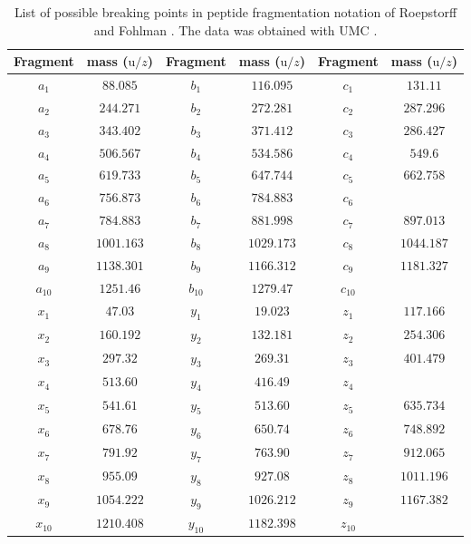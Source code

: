 \documentclass[a4paper,10pt]{article}
\begin{document}
\begin{appendices}
\begin{table}[htp!]
	\centering
	\caption{List of possible breaking points in peptide fragmentation notation of Roepstorff and Fohlman \cite{fragmentsnomenclature}. The data was obtained with UMC \cite{umc}. }
	\begin{tabular}{c | c | c | c | c | c}
		Fragment & mass (${\mathrm{u}}/{z}$) & Fragment & mass (${\mathrm{u}}/{z}$) & Fragment & mass (${\mathrm{u}}/{z}$) \\ \hline
		$a_1$ & $88.085$ & $b_1$ & $116.095$ & $c_1$ & $131.11$ \\
		$a_2$ & $244.271$ & $b_2$ & $272.281$ & $c_2$ & $287.296$ \\
		$a_3$ & $343.402$ & $b_3$ & $371.412$ & $c_3$ & $286.427$ \\
		$a_4$ & $506.567$ & $b_4$ & $534.586$ & $c_4$ & $549.6$ \\
		$a_5$ & $619.733$ & $b_5$ & $647.744$ & $c_5$ & $662.758$ \\
		$a_6$ & $756.873$ & $b_6$ & $784.883$ & $c_6$ &  \\
		$a_7$ & $784.883$ & $b_7$ & $881.998$ & $c_7$ & $897.013$ \\
		$a_8$ & $1001.163$ & $b_8$ & $1029.173$ & $c_8$ & $1044.187$ \\
		$a_9$ & $1138.301$ & $b_9$ & $1166.312$ & $c_9$ & $1181.327$ \\
		$a_{10}$ & $1251.46$ & $b_{10}$ & $1279.47$ & $c_{10}$ &  \\
		$x_{1}$ & $47.03$ & $y_{1}$ & $19.023$ & $z_{1}$ & $117.166$ \\
    $x_{2}$ & $160.192$ & $y_{2}$ & $132.181$ & $z_{2}$ & $254.306$ \\
    $x_{3}$ & $297.32$ & $y_{3}$ & $269.31$ & $z_{3}$ & $401.479$ \\
    $x_{4}$ & $513.60$ & $y_{4}$ & $416.49$ & $z_{4}$ &  \\
    $x_{5}$ & $541.61$ & $y_{5}$ & $513.60$ & $z_{5}$ & $635.734$ \\
    $x_{6}$ & $678.76$ & $y_{6}$ & $650.74$ & $z_{6}$ & $748.892$ \\
    $x_{7}$ & $791.92$ & $y_{7}$ & $763.90$ & $z_{7}$ & $912.065$ \\
    $x_{8}$ & $955.09$ & $y_{8}$ & $927.08$ & $z_{8}$ & $1011.196$ \\
    $x_{9}$ & $1054.222$ & $y_{9}$ & $1026.212$ & $z_{9}$ & $1167.382$ \\
    $x_{10}$ & $1210.408$ & $y_{10}$ & $1182.398$ & $z_{10}$ & $$ \\
	\end{tabular}
	\label{tab_fragments}
\end{table}


\end{appendices}
\end{document}
